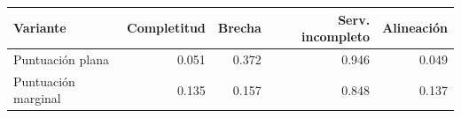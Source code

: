 \begin{tabular}{lrrrr}
\toprule
Variante & Completitud & Brecha & Serv. incompleto & Alineación \\
\midrule
Puntuación plana & 0.051 & 0.372 & 0.946 & 0.049 \\
Puntuación marginal & 0.135 & 0.157 & 0.848 & 0.137 \\
\bottomrule
\end{tabular}
